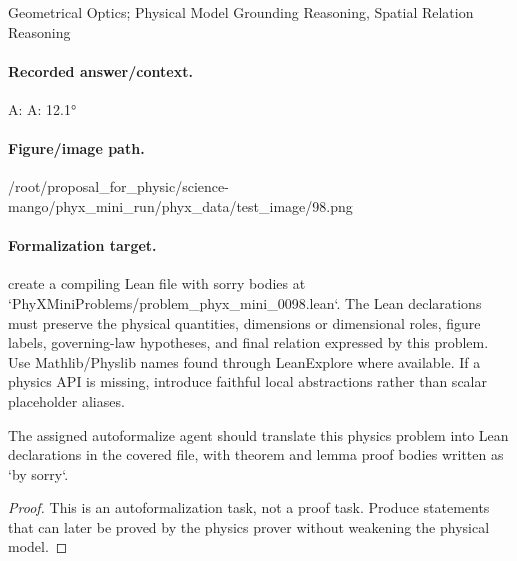 Geometrical Optics; Physical Model Grounding Reasoning, Spatial Relation Reasoning

\paragraph{Recorded answer/context.}
A: A: 12.1°

\paragraph{Figure/image path.}
/root/proposal\_for\_physic/science-mango/phyx\_mini\_run/phyx\_data/test\_image/98.png

\paragraph{Formalization target.}
create a compiling Lean file with sorry bodies at `PhyXMiniProblems/problem\_phyx\_mini\_0098.lean`. The Lean declarations must preserve the physical quantities, dimensions or dimensional roles, figure labels, governing-law hypotheses, and final relation expressed by this problem.
Use Mathlib/Physlib names found through LeanExplore where available. If a physics API is missing, introduce faithful local abstractions rather than scalar placeholder aliases.

\begin{theorem}
\label{thm:physics:phyx_mini_0098:target}
The assigned autoformalize agent should translate this physics problem into Lean declarations in the covered file, with theorem and lemma proof bodies written as `by sorry`.
\end{theorem}
\begin{proof}
This is an autoformalization task, not a proof task. Produce statements that can later be proved by the physics prover without weakening the physical model.
\end{proof}

